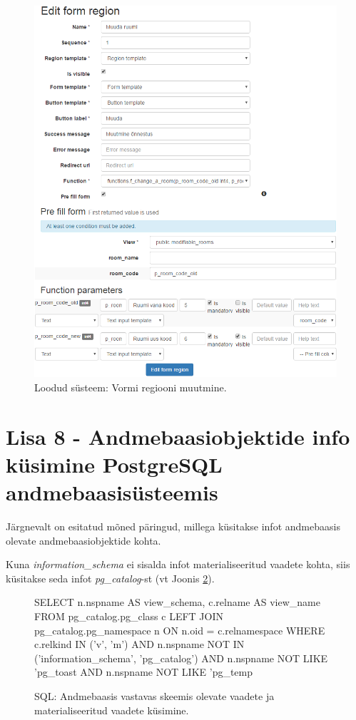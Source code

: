 \documentclass[a4paper,12pt]{article} %
\begin{document}
\begin{figure}[H]
\centering
\includegraphics[width=\textwidth]{./diagrams/pgapex-edit-form-region.png}
\caption{Loodud süsteem: Vormi regiooni muutmine.}
\label{fig_loodud_süsteem_vormi_regiooni_muutmine}
\end{figure}

\section*{Lisa 8 - Andmebaasiobjektide info küsimine PostgreSQL andmebaasisüsteemis}
Järgnevalt on esitatud mõned päringud, millega küsitakse infot andmebaasis olevate andmebaasiobjektide kohta.
\par
Kuna \textit{information\_schema} ei sisalda infot materialiseeritud vaadete kohta, siis küsitakse seda infot \textit{pg\_catalog}-st (vt Joonis \ref{sql_vaadete_metainfo_küsimine}).
\begin{figure}[H]
\centering
\begin{SQL}
SELECT n.nspname AS view_schema, c.relname AS view_name
FROM pg_catalog.pg_class c
LEFT JOIN pg_catalog.pg_namespace n ON n.oid = c.relnamespace
WHERE c.relkind IN ('v', 'm')
  AND n.nspname NOT IN ('information_schema', 'pg_catalog')
  AND n.nspname NOT LIKE 'pg_toast%
  AND n.nspname NOT LIKE 'pg_temp%
\end{SQL}
\caption{SQL: Andmebaasis vastavas skeemis olevate vaadete ja materialiseeritud vaadete küsimine.}
\label{sql_vaadete_metainfo_küsimine}
\end{figure}
\end{document}
